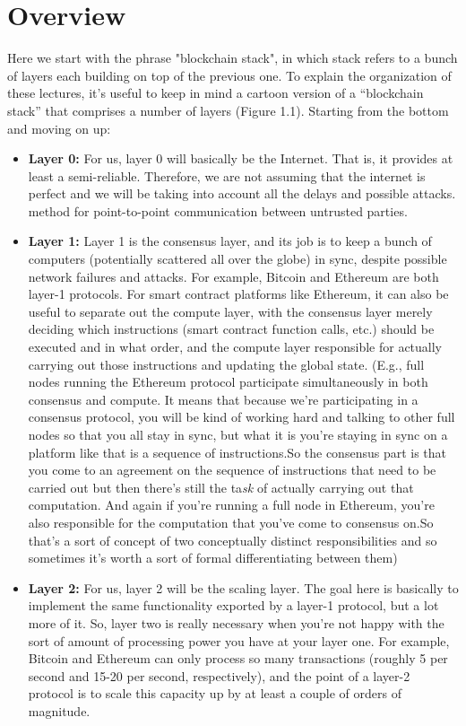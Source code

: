 \section{Overview}
Here we start with the phrase "blockchain stack", in which stack refers to a bunch of layers each building on top of the previous one. To explain the organization of these lectures, it’s useful to keep in mind a cartoon version
of a “blockchain stack” that comprises a number of layers (Figure 1.1). Starting from the bottom and moving on up:\\
\begin{itemize}
    \item \textbf{Layer 0:} For us, layer 0 will basically be the Internet. That is, it provides at least a semi-reliable. Therefore, we are not assuming that the internet is perfect and we will be taking into account all the delays and possible attacks.
method for point-to-point communication between untrusted parties.
    \item \textbf{Layer 1:} Layer 1 is the consensus  layer, and its job is to keep a bunch of computers (potentially
    scattered all over the globe) in sync, despite possible network failures and attacks.
    For example, Bitcoin and Ethereum are both layer-1 protocols. For smart contract
    platforms like Ethereum, it can also be useful to separate out the compute layer, with
    the consensus layer merely deciding which instructions (smart contract function calls,
    etc.) should be executed and in what order, and the compute layer responsible for
    actually carrying out those instructions and updating the global state. (E.g., full
    nodes running the Ethereum protocol participate simultaneously in both consensus
    and compute. It means that because we're participating in a consensus protocol, you will be kind
    of working hard and talking to other
    full nodes so that you all stay in sync,
    but what it is you're staying in sync 
    on a platform like that is a sequence of
    instructions.So the consensus
    part is that you come to an agreement on the
    sequence of instructions that need to be
    carried out but then there's still the
    ta\textit{sk} of actually carrying out that
    computation. And again if you're running
    a full node in Ethereum, you're also
    responsible for the computation that
    you've come to consensus on.So that's a
    sort of concept of two conceptually
    distinct responsibilities and so
    sometimes it's worth a sort of formal
    differentiating between them)
    \item \textbf{Layer 2:} For us, layer 2 will be the scaling layer. The goal here is basically to implement the
    same functionality exported by a layer-1 protocol, but a lot more of it. So, layer two is really necessary when you're not happy
    with the sort of amount of processing
    power you have
    at your layer one.
    For example,
    Bitcoin and Ethereum can only process so many transactions (roughly 5 per second
    and 15-20 per second, respectively), and the point of a layer-2 protocol is to scale this capacity up by at least a couple of orders of magnitude.


\end{itemize}
